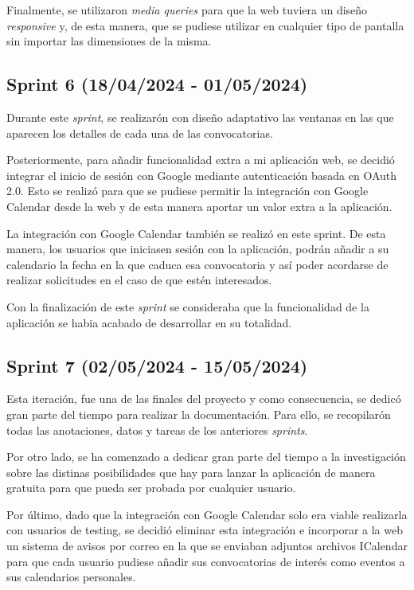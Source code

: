 Finalmente, se utilizaron \textit{media queries} para que la web tuviera un diseño \textit{responsive}  y, de esta manera, que se pudiese utilizar en cualquier tipo de pantalla sin importar las dimensiones de la misma.


\subsection{Sprint 6 (18/04/2024 -
01/05/2024)}

Durante este \textit{sprint}, se realizarón con diseño adaptativo las ventanas en las que aparecen los detalles de cada una de las convocatorias.

Posteriormente, para añadir funcionalidad extra a mi aplicación web, se decidió integrar el inicio de sesión con Google mediante autenticación basada en OAuth 2.0. Esto se realizó para que se pudiese permitir la integración con Google Calendar desde la web y de esta manera aportar un valor extra a la aplicación.

La integración con Google Calendar también se realizó en este sprint. De esta manera, los usuarios que iniciasen sesión con la aplicación, podrán añadir a su calendario la fecha en la que caduca esa convocatoria y así poder acordarse de realizar solicitudes en el caso de que estén interesados.

Con la finalización de este \textit{sprint} se consideraba que la funcionalidad de la aplicación se habia acabado de desarrollar en su totalidad.


\subsection{Sprint 7 (02/05/2024 -
15/05/2024)}
Esta iteración, fue una de las finales del proyecto y como consecuencia, se dedicó gran parte del tiempo para realizar la documentación. Para ello, se recopilarón todas las anotaciones, datos y tareas de los anteriores \textit{sprints}. 

Por otro lado, se ha comenzado a dedicar gran parte del tiempo a la investigación sobre las distinas posibilidades que hay para lanzar la aplicación de manera gratuita para que pueda ser probada por cualquier usuario.

Por último, dado que la integración con Google Calendar solo era viable realizarla con usuarios de testing, se decidió eliminar esta integración e incorporar a la web un sistema de avisos por correo en la que se enviaban adjuntos archivos ICalendar para que cada usuario pudiese añadir sus convocatorias de interés como eventos a sus calendarios personales.

